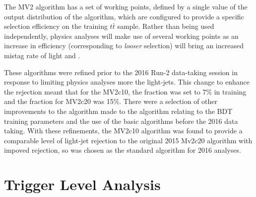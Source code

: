	The MV2 algorithm has a set of working points, defined by a single value of the output distribution of the algorithm, which are configured to provide a specific \bjet selection efficiency on the training $t\bar{t}$ sample. Rather than being used independently, physics analyses will make use of several working points as an increase in \bjet efficiency (corresponding to \textit{looser} \bjet selection) will bring an increased mistag rate of light and \cjets.
	
	These algorithms were refined prior to the 2016 Run-2 data-taking session in response to \cjets limiting physics analyses more the light-jets. This change  to enhance the \cjet rejection meant that for the MV2c10, the \cjet fraction was set to 7\% in training and the fraction for MV2c20 was 15\%. There were a selection of other improvements to the algorithm made to the algorithm relating to the BDT training parameters and the use of the basic algorithms before the 2016 data taking. With these refinements, the MV2c10 algorithm was found to provide a comparable level of light-jet rejection to the original 2015 Mv2c20 algorithm with impoved \cjet rejection, so was chosen as the standard \btag algorithm for 2016 analyses. \cite{btagOptimisation}
	
	
\section{Trigger Level Analysis}
	
	
\endinput
